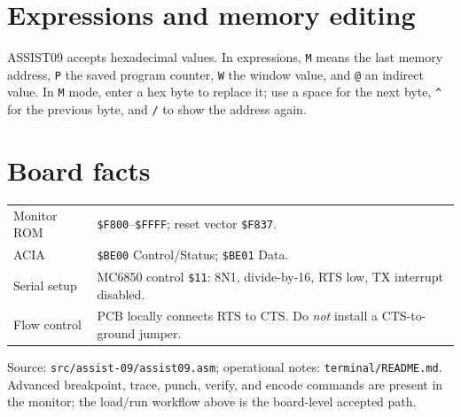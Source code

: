 \documentclass[9pt,a4paper]{article}
\newcommand{\cmd}[1]{\texttt{#1}}
\newcommand{\hex}[1]{\texttt{\$#1}}
\begin{document}
\section*{Expressions and memory editing}

ASSIST09 accepts hexadecimal values.  In expressions, \cmd{M} means the last memory address, \cmd{P} the saved program counter, \cmd{W} the window value, and \cmd{@} an indirect value.  In \cmd{M} mode, enter a hex byte to replace it; use a space for the next byte, \cmd{\^{}} for the previous byte, and \cmd{/} to show the address again.

\section*{Board facts}

\begin{tabularx}{\linewidth}{@{}lX@{}}
\toprule
Monitor ROM & \hex{F800}--\hex{FFFF}; reset vector \hex{F837}. \\
ACIA & \hex{BE00} Control/Status; \hex{BE01} Data. \\
Serial setup & MC6850 control \hex{11}: 8N1, divide-by-16, RTS low, TX interrupt disabled. \\
Flow control & PCB locally connects RTS to CTS.  Do \emph{not} install a CTS-to-ground jumper. \\
\bottomrule
\end{tabularx}

\vfill
\footnotesize
Source: \texttt{src/assist-09/assist09.asm}; operational notes: \texttt{terminal/README.md}.  Advanced breakpoint, trace, punch, verify, and encode commands are present in the monitor; the load/run workflow above is the board-level accepted path.
\end{document}
